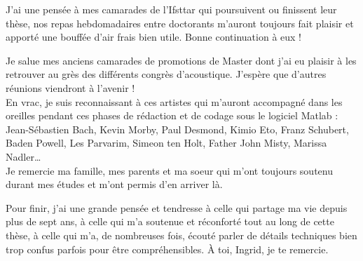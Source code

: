 J'ai une pensée à mes camarades de l'Ifsttar qui poursuivent ou finissent leur thèse, nos repas hebdomadaires entre doctorants m'auront toujours fait plaisir et apporté une bouffée d'air frais bien utile. Bonne continuation à eux !

Je salue mes anciens camarades de promotions de Master dont j'ai eu plaisir à les retrouver au grès des différents congrès d'acoustique. J'espère que d'autres réunions viendront à l'avenir !\\

En vrac, je suis reconnaissant à ces artistes qui m'auront accompagné dans les oreilles pendant ces phases de rédaction et de codage sous le logiciel Matlab : Jean-Sébastien Bach, Kevin Morby, Paul Desmond, Kimio Eto, Franz Schubert, Baden Powell, Les Parvarim, Simeon ten Holt, Father John Misty, Marissa Nadler\dots\\

Je remercie ma famille, mes parents et ma soeur qui m'ont toujours soutenu durant mes études et m'ont permis d'en arriver là.

Pour finir, j'ai une grande pensée et tendresse à celle qui partage ma vie depuis plus de sept ans, à celle qui m'a soutenue et réconforté tout au long de cette thèse, à celle qui m'a, de nombreuses fois, écouté parler de détails techniques bien trop confus parfois pour être compréhensibles. \`A toi, Ingrid, je te remercie.\\


